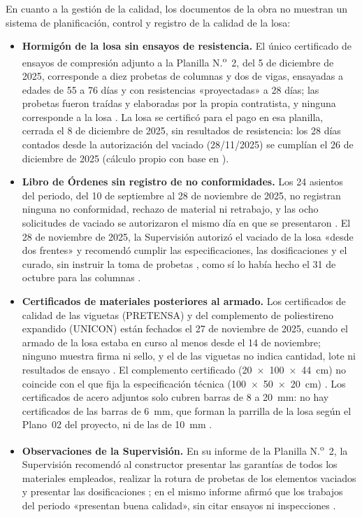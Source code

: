 En cuanto a la gestión de la calidad, los documentos de la obra no muestran un sistema de planificación, control y registro de la calidad de la losa:
\begin{itemize}
  \item \textbf{Hormigón de la losa sin ensayos de resistencia.} El único certificado de ensayos de compresión adjunto a la Planilla N.\textsuperscript{o}~2, del 5 de diciembre de 2025, corresponde a diez probetas de columnas y dos de vigas, ensayadas a edades de 55 a 76 días y con resistencias «proyectadas» a 28 días; las probetas fueron traídas y elaboradas por la propia contratista, y ninguna corresponde a la losa \parencites{labuatf2025}[p.~78]{uatf2025pao2}. La losa se certificó para el pago en esa planilla, cerrada el 8 de diciembre de 2025, sin resultados de resistencia: los 28 días contados desde la autorización del vaciado (28/11/2025) se cumplían el 26 de diciembre de 2025 (cálculo propio con base en \cite[pp.~16, 125]{uatf2025pao2}).
  \item \textbf{Libro de Órdenes sin registro de no conformidades.} Los 24 asientos del periodo, del 10 de septiembre al 28 de noviembre de 2025, no registran ninguna no conformidad, rechazo de material ni retrabajo, y las ocho solicitudes de vaciado se autorizaron el mismo día en que se presentaron \parencite[pp.~114--125]{uatf2025pao2}. El 28 de noviembre de 2025, la Supervisión autorizó el vaciado de la losa «desde dos frentes» y recomendó cumplir las especificaciones, las dosificaciones y el curado, sin instruir la toma de probetas \parencite[p.~125]{uatf2025pao2}, como sí lo había hecho el 31 de octubre para las columnas \parencite[p.~121]{uatf2025pao2}.
  \item \textbf{Certificados de materiales posteriores al armado.} Los certificados de calidad de las viguetas (PRETENSA) y del complemento de poliestireno expandido (UNICON) están fechados el 27 de noviembre de 2025, cuando el armado de la losa estaba en curso al menos desde el 14 de noviembre; ninguno muestra firma ni sello, y el de las viguetas no indica cantidad, lote ni resultados de ensayo \parencites[pp.~80--81, 122]{uatf2025pao2}{pretensa2025,unicon2025}. El complemento certificado (20~$\times$~100~$\times$~44~cm) no coincide con el que fija la especificación técnica (100~$\times$~50~$\times$~20~cm) \parencite[p.~3]{uatf_et}. Los certificados de acero adjuntos solo cubren barras de 8 a 20~mm: no hay certificados de las barras de 6~mm, que forman la parrilla de la losa según el Plano~02 del proyecto, ni de las de 10~mm \parencite[pp.~82--86]{uatf2025pao2}.
  \item \textbf{Observaciones de la Supervisión.} En su informe de la Planilla N.\textsuperscript{o}~2, la Supervisión recomendó al constructor presentar las garantías de todos los materiales empleados, realizar la rotura de probetas de los elementos vaciados y presentar las dosificaciones \parencite[p.~9]{uatf2025pao2}; en el mismo informe afirmó que los trabajos del periodo «presentan buena calidad», sin citar ensayos ni inspecciones \parencite[p.~11]{uatf2025pao2}.
\end{itemize}

